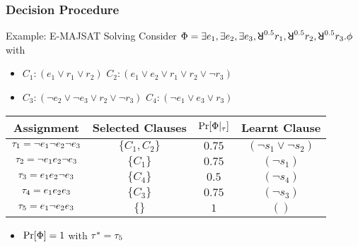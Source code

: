 \begin{frame}
    \frametitle{Decision Procedure}
    \begin{block}{Example: E-MAJSAT Solving}
        Consider $\Qf=\exists e_1,\exists e_2,\exists e_3,\random{0.5} r_1,\random{0.5} r_2,\random{0.5} r_3.\pf$ with
        \begin{itemize}
            \item[] $C_1: (e_1 \lor r_1 \lor r_2)$ $C_2: (e_1 \lor e_2 \lor r_1 \lor r_2 \lor \lnot r_3)$
            \item[] $C_3: (\lnot e_2 \lor \lnot e_3 \lor r_2 \lor \lnot r_3)$ $C_4: (\lnot e_1 \lor e_3 \lor r_3)$
        \end{itemize}
        \begin{table}[t]
            \centering
            \small
            \begin{tabular}{c|c|c|c}
                Assignment                            & Selected Clauses & $\Pr[\Phi|_{\tau}]$ & Learnt Clause                \\
                \hline
                $\tau_1=\lnot e_1 \lnot e_2 \lnot e_3$ & $\{C_1,C_2\}$    & $0.75$                 & $(\lnot s_1 \lor \lnot s_2)$ \\
                $\tau_2=\lnot e_1 e_2 \lnot e_3$       & $\{C_1\}$        & $0.75$                 & $(\lnot s_1)$                \\
                $\tau_3=e_1 e_2 \lnot e_3$             & $\{C_4\}$        & $0.5$                  & $(\lnot s_4)$                \\
                $\tau_4=e_1 e_2 e_3$                   & $\{C_3\}$        & $0.75$                 & $(\lnot s_3)$                \\
                $\tau_5=e_1 \lnot e_2 e_3$             & $\{\}$           & $1$                    & $()$
            \end{tabular}
        \end{table}
        \begin{itemize}
            \item $\Pr[\Phi]=1$ with $\tau^*=\tau_5$
        \end{itemize}
    \end{block}
\end{frame}

